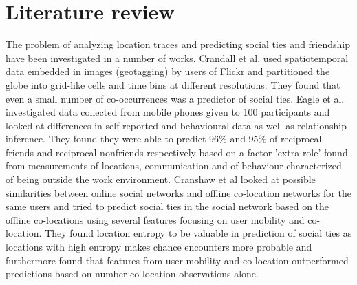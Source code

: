 \section{Literature review}
The problem of analyzing location traces and predicting social ties and friendship have been investigated in a number of works. Crandall et al.\cite{ISTfGC} used spatiotemporal data embedded in images (geotagging) by users of Flickr and partitioned the globe into grid-like cells and time bins at different resolutions. They found that even a small number of co-occurrences was a predictor of social ties. 
Eagle et al.\cite{eagle} investigated data collected from mobile phones given to 100 participants and looked at differences in self-reported and behavioural data as well as relationship inference. They found they were able to predict 96\% and 95\% of reciprocal friends and reciprocal nonfriends respectively based on a factor 'extra-role' found from measurements of locations, communication and of behaviour characterized of being outside the work environment. Cranshaw et al\cite{cranshaw2010bridging} looked at possible similarities between online social networks and offline co-location networks for the same users and tried to predict social ties in the social network based on the offline co-locations using several features focusing on user mobility and co-location. They found location entropy to be valuable in prediction of social ties as locations with high entropy makes chance encounters more probable and furthermore found that features from user mobility and co-location outperformed predictions based on number co-location observations alone.
